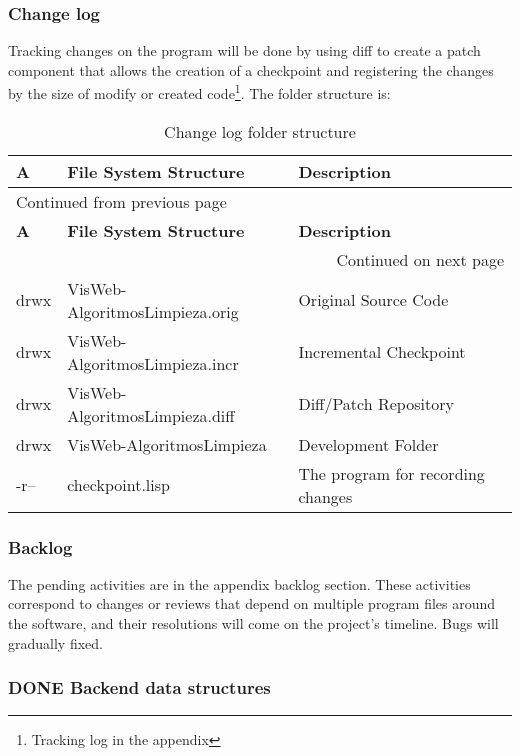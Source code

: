 \documentclass[a4paper]{article}
\begin{document}
\subsubsection{Change log}
\label{sec:orga785107}

Tracking changes on the program will be done by using diff to create a patch component that allows the creation of a checkpoint and registering the changes by the size of modify or created code\footnote{Tracking log in the appendix}. The folder structure is:

\sffamily
\begin{longtable}{lll}
\caption{Change log folder structure}
\\[0pt]
\textbf{A} & \textbf{File System Structure} & \textbf{Description}\\[0pt]
\hline
\endfirsthead
\multicolumn{3}{l}{Continued from previous page} \\[0pt]
\hline

\textbf{A} & \textbf{File System Structure} & \textbf{Description} \\[0pt]

\hline
\endhead
\hline\multicolumn{3}{r}{Continued on next page} \\
\endfoot
\endlastfoot
\hline
drwx & VisWeb-AlgoritmosLimpieza.orig & Original Source Code\\[0pt]
drwx & VisWeb-AlgoritmosLimpieza.incr & Incremental Checkpoint\\[0pt]
drwx & VisWeb-AlgoritmosLimpieza.diff & Diff/Patch Repository\\[0pt]
drwx & VisWeb-AlgoritmosLimpieza & Development Folder\\[0pt]
-r-- & checkpoint.lisp & The program for recording changes\\[0pt]
\end{longtable}
\rmfamily

\subsubsection{Backlog}
\label{sec:org7ea4886}

The pending activities are in the appendix backlog section. These activities correspond to changes or reviews that depend on multiple program files around the software, and their resolutions will come on the project's timeline. Bugs will gradually fixed.

\subsubsection{{\bfseries\sffamily DONE} Backend data structures}
\label{sec:orgf45b970}
\end{document}
